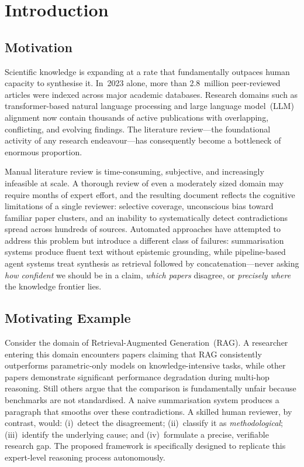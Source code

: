 \documentclass{llncs}
\begin{document}
\section{Introduction}
\label{sec:intro}

\subsection{Motivation}

Scientific knowledge is expanding at a rate that fundamentally outpaces human
capacity to synthesise it. In~2023 alone, more than 2.8~million peer-reviewed
articles were indexed across major academic databases. Research domains such as
transformer-based natural language processing and large language model~(LLM)
alignment now contain thousands of active publications with overlapping,
conflicting, and evolving findings. The literature review—the foundational
activity of any research endeavour—has consequently become a bottleneck of
enormous proportion.

Manual literature review is time-consuming, subjective, and increasingly
infeasible at scale. A thorough review of even a moderately sized domain may
require months of expert effort, and the resulting document reflects the cognitive
limitations of a single reviewer: selective coverage, unconscious bias toward
familiar paper clusters, and an inability to systematically detect contradictions
spread across hundreds of sources. Automated approaches have attempted to
address this problem but introduce a different class of failures: summarisation
systems produce fluent text without epistemic grounding, while pipeline-based
agent systems treat synthesis as retrieval followed by concatenation—never
asking \textit{how confident} we should be in a claim, \textit{which papers}
disagree, or \textit{precisely where} the knowledge frontier lies.

\subsection{Motivating Example}

Consider the domain of Retrieval-Augmented Generation~(RAG). A researcher
entering this domain encounters papers claiming that RAG consistently
outperforms parametric-only models on knowledge-intensive tasks, while other
papers demonstrate significant performance degradation during multi-hop
reasoning. Still others argue that the comparison is fundamentally unfair because
benchmarks are not standardised. A naive summarisation system produces a
paragraph that smooths over these contradictions. A skilled human reviewer, by
contrast, would: (i)~detect the disagreement; (ii)~classify it as
\textit{methodological}; (iii)~identify the underlying cause; and (iv)~formulate
a precise, verifiable research gap. The proposed framework is specifically
designed to replicate this expert-level reasoning process autonomously.
\end{document}
